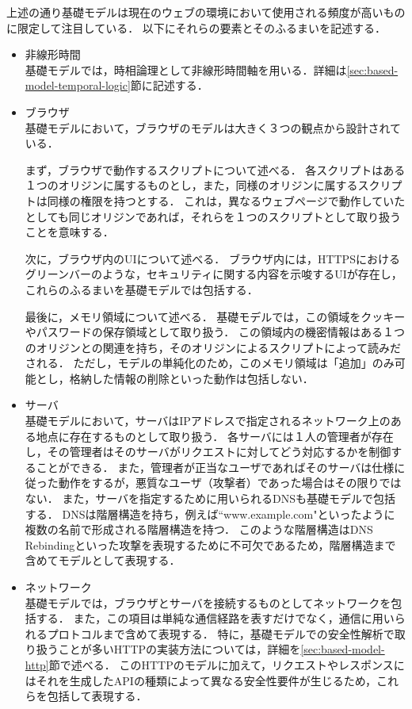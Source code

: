 \documentclass[12pt,a4paper]{jbook}
\begin{document}
上述の通り基礎モデルは現在のウェブの環境において使用される頻度が高いものに限定して注目している．
以下にそれらの要素とそのふるまいを記述する．
\begin{itemize}
\item 非線形時間 \\
基礎モデルでは，時相論理として非線形時間軸を用いる．詳細は\ref{sec:based-model-temporal-logic}節に記述する．
\item ブラウザ \\
基礎モデルにおいて，ブラウザのモデルは大きく３つの観点から設計されている．

まず，ブラウザで動作するスクリプトについて述べる．
各スクリプトはある１つのオリジンに属するものとし，また，同様のオリジンに属するスクリプトは同様の権限を持つとする．
これは，異なるウェブページで動作していたとしても同じオリジンであれば，それらを１つのスクリプトとして取り扱うことを意味する．

次に，ブラウザ内のUIについて述べる．
ブラウザ内には，HTTPSにおけるグリーンバーのような，セキュリティに関する内容を示唆するUIが存在し，これらのふるまいを基礎モデルでは包括する．

最後に，メモリ領域について述べる．
基礎モデルでは，この領域をクッキーやパスワードの保存領域として取り扱う．
この領域内の機密情報はある１つのオリジンとの関連を持ち，そのオリジンによるスクリプトによって読みだされる．
ただし，モデルの単純化のため，このメモリ領域は「追加」のみ可能とし，格納した情報の削除といった動作は包括しない．
\item サーバ \\
基礎モデルにおいて，サーバはIPアドレスで指定されるネットワーク上のある地点に存在するものとして取り扱う．
各サーバには１人の管理者が存在し，その管理者はそのサーバがリクエストに対してどう対応するかを制御することができる．
また，管理者が正当なユーザであればそのサーバは仕様に従った動作をするが，悪質なユーザ（攻撃者）であった場合はその限りではない．
また，サーバを指定するために用いられるDNSも基礎モデルで包括する．
DNSは階層構造を持ち，例えば``www.example.com"といったように複数の名前で形成される階層構造を持つ．
このような階層構造はDNS Rebinding\cite{dns-rebinding}といった攻撃を表現するために不可欠であるため，階層構造まで含めてモデルとして表現する．
\item ネットワーク \\
基礎モデルでは，ブラウザとサーバを接続するものとしてネットワークを包括する．
また，この項目は単純な通信経路を表すだけでなく，通信に用いられるプロトコルまで含めて表現する．
特に，基礎モデルでの安全性解析で取り扱うことが多いHTTPの実装方法については，詳細を\ref{sec:based-model-http}節で述べる．
このHTTPのモデルに加えて，リクエストやレスポンスにはそれを生成したAPIの種類によって異なる安全性要件が生じるため，これらを包括して表現する．
\end{itemize}
\end{document}
